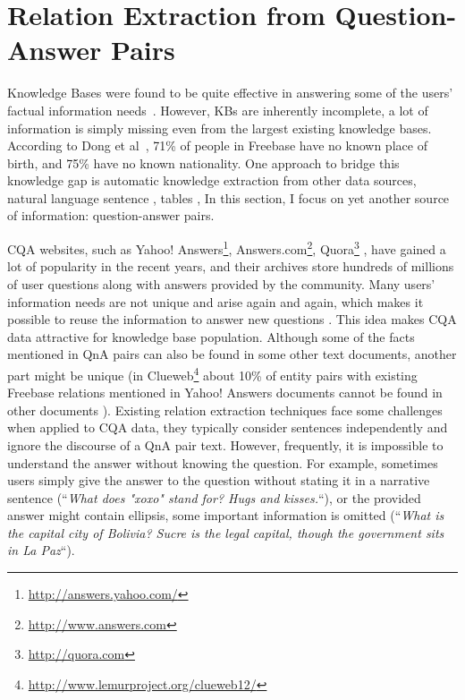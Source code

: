 
\section{Relation Extraction from Question-Answer Pairs}
\label{section:factoid:cqarelextract}

Knowledge Bases were found to be quite effective in answering some of the users' factual information needs~\cite{unger2014introduction}.
However, KBs are inherently incomplete, \ie a lot of information is simply missing even from the largest existing knowledge bases.
According to Dong et al~\cite{Dong:2014:KVW:2623330.2623623}, 71\% of people in
Freebase have no known place of birth, and 75\% have no known nationality.
One approach to bridge this knowledge gap is automatic knowledge extraction from other data sources, \eg natural language sentence \cite{Agichtein:2000:SER:336597.336644,Gupta:2014:BOS:2732286.2732288,jijkoun2004information,MintzBSJ09}, tables \cite{Cafarella:2008:WEP:1453856.1453916}, \etc
In this section, I focus on yet another source of information: question-answer pairs.

CQA websites, such as Yahoo! Answers\footnote{\href{url}{http://answers.yahoo.com/}}, Answers.com\footnote{\href{url}{http://www.answers.com}}, Quora\footnote{\href{url}{http://quora.com}} \etc, have gained a lot of popularity in the recent years, and their archives store hundreds of millions of user questions along with answers provided by the community.
Many users' information needs are not unique and arise again and again, which makes it possible to reuse the information to answer new questions \cite{Shtok:2012:LPA:2187836.2187939}.
This idea makes CQA data attractive for knowledge base population.
Although some of the facts mentioned in QnA pairs can also be found in some other text documents, another part might be unique (\eg in Clueweb\footnote{\href{url}{http://www.lemurproject.org/clueweb12/}} about 10\% of entity pairs with existing Freebase relations mentioned in Yahoo! Answers documents cannot be found in other documents \cite{savenkov2015relation}).
Existing relation extraction techniques face some challenges when applied to CQA data, \ie they typically consider sentences independently and ignore the discourse of a QnA pair text.
However, frequently, it is impossible to understand the answer without knowing the question.
For example, sometimes users simply give the answer to the question without stating it in a narrative sentence (\eg ``\textit{What does "xoxo" stand for? Hugs and kisses.}``), or the provided answer might contain ellipsis, \ie some important information is omitted (\eg ``\textit{What is the capital city of Bolivia? Sucre is the legal capital, though the government sits in La Paz}``).

